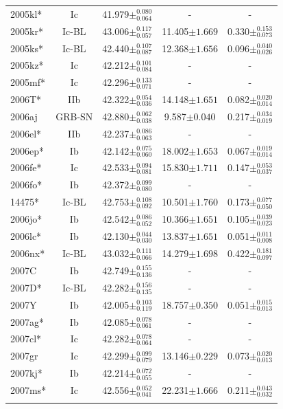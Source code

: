 \documentclass[a4paper,fleqn,usenatbib]{mnras}
\begin{document}
\begin{table}
\begin{minipage}{110mm}
\begin{tabular}{lcccc}
2005kl* & Ic & 41.979$\pm^{0.080}_{0.064}$ &- &- \\
2005kr* & Ic-BL & 43.006$\pm^{0.117}_{0.057}$ &11.405$\pm{1.669}$ &0.330$\pm^{0.153}_{0.073}$ \\
2005ks* & Ic-BL & 42.440$\pm^{0.107}_{0.087}$ &12.368$\pm{1.656}$ &0.096$\pm^{0.040}_{0.026}$ \\
2005kz* & Ic & 42.212$\pm^{0.101}_{0.084}$ &- &- \\
2005mf* & Ic & 42.296$\pm^{0.133}_{0.071}$ &- &- \\
2006T* & IIb & 42.322$\pm^{0.054}_{0.036}$ &14.148$\pm{1.651}$ &0.082$\pm^{0.020}_{0.014}$ \\
2006aj & GRB-SN & 42.880$\pm^{0.062}_{0.038}$ &9.587$\pm{0.040}$ &0.217$\pm^{0.034}_{0.019}$ \\
2006el* & IIb & 42.237$\pm^{0.086}_{0.063}$ &- &- \\
2006ep* & Ib & 42.142$\pm^{0.075}_{0.060}$ &18.002$\pm{1.653}$ &0.067$\pm^{0.019}_{0.014}$ \\
2006fe* & Ic & 42.533$\pm^{0.094}_{0.081}$ &15.830$\pm{1.711}$ &0.147$\pm^{0.053}_{0.037}$ \\
2006fo* & Ib & 42.372$\pm^{0.099}_{0.080}$ &- &- \\
14475* & Ic-BL & 42.753$\pm^{0.108}_{0.092}$ &10.501$\pm{1.760}$ &0.173$\pm^{0.077}_{0.050}$ \\
2006jo* & Ib & 42.542$\pm^{0.086}_{0.052}$ &10.366$\pm{1.651}$ &0.105$\pm^{0.039}_{0.023}$ \\
2006lc* & Ib & 42.130$\pm^{0.044}_{0.030}$ &13.837$\pm{1.651}$ &0.051$\pm^{0.011}_{0.008}$ \\
2006nx* & Ic-BL & 43.032$\pm^{0.111}_{0.066}$ &14.279$\pm{1.698}$ &0.422$\pm^{0.181}_{0.097}$ \\
2007C & Ib & 42.749$\pm^{0.155}_{0.136}$ &- &- \\
2007D* & Ic-BL & 42.282$\pm^{0.156}_{0.135}$ &- &- \\
2007Y & Ib & 42.005$\pm^{0.103}_{0.119}$ &18.757$\pm{0.350}$ &0.051$\pm^{0.015}_{0.013}$ \\
2007ag* & Ib & 42.085$\pm^{0.078}_{0.061}$ &- &- \\
2007cl* & Ic & 42.282$\pm^{0.078}_{0.064}$ &- &- \\
2007gr & Ic & 42.299$\pm^{0.099}_{0.079}$ &13.146$\pm{0.229}$ &0.073$\pm^{0.020}_{0.013}$ \\
2007kj* & Ib & 42.214$\pm^{0.072}_{0.055}$ &- &- \\
2007ms* & Ic & 42.556$\pm^{0.052}_{0.041}$ &22.231$\pm{1.666}$ &0.211$\pm^{0.043}_{0.032}$ \\
\hline
 \label{fullstats}
\end{tabular}
\end{minipage}
\end{table}
\end{document}
